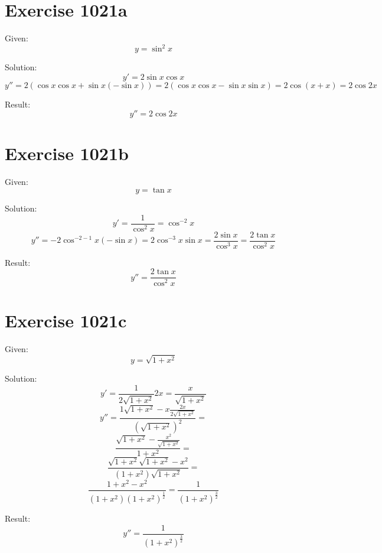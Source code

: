 \documentclass[a4paper, 10pt]{scrartcl}
\begin{document}
\section{Exercise 1021a}

Given:
\[
y = \sin^{2}{x}
\]

Solution:
\[
y' = 2\sin{x}\cos{x}
\]
\[
y'' = 2(\cos{x}\cos{x} + \sin{x}(-\sin{x})) = 2(\cos{x}\cos{x} - \sin{x}\sin{x}) = 2\cos{(x + x)} = 2\cos{2x}
\]

Result:
\[
y'' = 2\cos{2x}
\]

\section{Exercise 1021b}

Given:
\[
y = \tan{x}
\]

Solution:
\[
y' = \frac{1}{\cos^{2}{x}} = \cos^{-2}{x}
\]
\[
y'' = -2\cos^{-2 - 1}{x}(-\sin{x}) = 2\cos^{-3}{x}\sin{x} = \frac{2\sin{x}}{\cos^{3}{x}} = \frac{2\tan{x}}{\cos^{2}{x}}
\]

Result:
\[
y'' = \frac{2\tan{x}}{\cos^{2}{x}}
\]

\section{Exercise 1021c}

Given:
\[
y = \sqrt{1 + x^{2}}
\]

Solution:
\[
y' = \frac{1}{2\sqrt{1 + x^{2}}}2x = \frac{x}{\sqrt{1 + x^{2}}}
\]
\[
y'' = \frac{1\sqrt{1 + x^{2}} - x\frac{2x}{2\sqrt{1 + x^{2}}}}{(\sqrt{1 + x^{2}})^{2}} =
\]
\[
\frac{\sqrt{1 + x^{2}} - \frac{x^{2}}{\sqrt{1 + x^{2}}}}{1 + x^{2}} =
\]
\[
\frac{\sqrt{1 + x^{2}}\sqrt{1 + x^{2}} - x^{2}}{(1 + x^{2})\sqrt{1 + x^{2}}} =
\]
\[
\frac{1 + x^{2} - x^{2}}{(1 + x^{2})(1 + x^{2})^{\frac{1}{2}}} = \frac{1}{(1 + x^{2})^{\frac{3}{2}}}
\]

Result:
\[
y'' = \frac{1}{(1 + x^{2})^{\frac{3}{2}}}
\]
\end{document}
